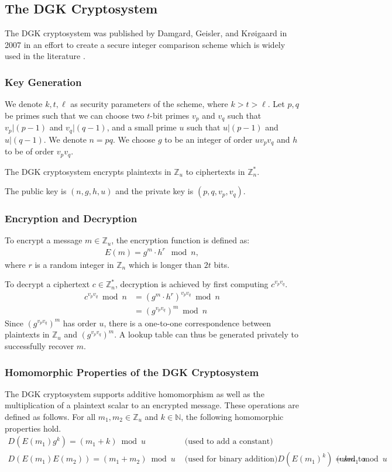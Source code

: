 \subsection{The DGK Cryptosystem}
The DGK cryptosystem was published by Damgard, Geisler, and Krøigaard in 2007 in an effort to create a secure integer comparison scheme \cite{pieprzyk_efficient_2007, cryptoeprint:2008:321} which is widely used in the literature \cite{veugen_improving_2012}.

\subsubsection{Key Generation}
We denote $k,t,\ell$ as security parameters of the scheme, where $k>t>\ell$.
Let $p,q$ be primes such that
we can choose two $t$-bit primes $v_p$ and $v_q$ such that $v_p | (p-1)$ and $v_q | (q-1)$, and a small prime $u$ such that $u | (p-1)$ and $u | (q-1)$.
We denote $n = pq$.
We choose $g$ to be an integer of order $uv_pv_q$ and $h$ to be of order $v_pv_q$.

The DGK cryptosystem encrypts plaintexts in $\mathbb{Z}_u$ to ciphertexts in $\mathbb{Z}_n^\ast$.

The public key is $(n,g,h,u)$ and the private key is $(p,q,v_p,v_q)$.

\subsubsection{Encryption and Decryption}
To encrypt a message $m \in \mathbb{Z}_u$, the encryption function is defined as:
\begin{align*}
  E(m) = g^m \cdot h^r \mod{n},
\end{align*}
where $r$ is a random integer in $\mathbb{Z}_n$ which is longer than $2t$ bits.

To decrypt a ciphertext $c \in \mathbb{Z}_n^\ast$, decryption is achieved by first computing $c^{v_pv_q}$.
\begin{align*}
	c^{v_pv_q} \bmod n
	&= (g^m \cdot h^r)^{v_pv_q} \bmod n\\
	&= (g^{v_pv_q})^m \bmod n
\end{align*}
Since $(g^{v_pv_q})^m$ has order $u$, there is a one-to-one correspondence between plaintexts in $\mathbb{Z}_u$ and  $(g^{v_pv_q})^m$. A lookup table can thus be generated privately to successfully recover $m$.

\subsubsection{Homomorphic Properties of the DGK Cryptosystem}
The DGK cryptosystem supports additive homomorphism as well as the multiplication of a plaintext scalar to an encrypted message. These operations are defined as follows.
For all $m_1,m_2 \in \mathbb{Z}_u$ and $k\in \mathbb{N}$, the following homomorphic properties hold.
\begin{align*}
    D(E(m_1)g^k)=(m_1+k)\bmod u & \text{ (used to add a constant)}\\
    D(E(m_1)E(m_2))=(m_1+m_2)\bmod u & \text{ (used for binary addition)}
    D(E(m_1)^k)= km_1\bmod u & \text{ (used to multiply a plaintext constant)}
\end{align*}

